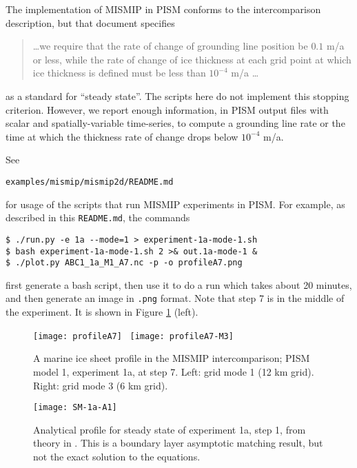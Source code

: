 The implementation of MISMIP in PISM conforms to the intercomparison description, but that document specifies
\begin{quotation}
\dots we require that the rate of change of grounding line position be $0.1$ m/a or less, while the rate of change of ice thickness at each grid point at which ice thickness is defined must be less than $10^{-4}$ m/a \dots
\end{quotation}
as a standard for ``steady state''.  The scripts here do not implement this stopping criterion.  However, we report enough information, in PISM output files with scalar and spatially-variable time-series, to compute a grounding line rate or the time at which the thickness rate of change drops below $10^{-4}$ m/a.

See

  \centerline{\texttt{examples/mismip/mismip2d/README.md}}

\noindent for usage of the scripts that run MISMIP experiments in PISM.  For example, as described in this \texttt{README.md}, the commands

\begin{verbatim}
$ ./run.py -e 1a --mode=1 > experiment-1a-mode-1.sh
$ bash experiment-1a-mode-1.sh 2 >& out.1a-mode-1 &
$ ./plot.py ABC1_1a_M1_A7.nc -p -o profileA7.png
\end{verbatim}

\noindent first generate a bash script, then use it to do a run which takes about 20 minutes, and then generate an image in \texttt{.png} format.  Note that step 7 is in the middle of the experiment.  It is shown in Figure \ref{fig:MISMIPmodel1exper1aA7} (left).
 
\begin{figure}[ht]
\centering
\texttt{[image: profileA7]} \,
\texttt{[image: profileA7-M3]}
\caption{A marine ice sheet profile in the MISMIP intercomparison; PISM model 1, experiment 1a, at step 7.  Left: grid mode 1 (12 km grid).  Right: grid mode 3 (6 km grid).}
\label{fig:MISMIPmodel1exper1aA7}
\end{figure}

\begin{figure}[ht]
\centering
\texttt{[image: SM-1a-A1]}
\caption{Analytical profile for steady state of experiment 1a, step 1, from theory in \cite{SchoofMarine1}.  This is a boundary layer asymptotic matching result, but not the exact solution to the equations.}
\label{fig:SMexper1aM1A1}
\end{figure}

